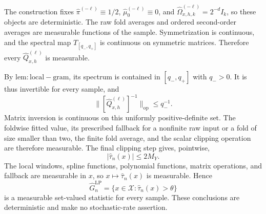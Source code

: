 The construction fixes \(\widehat\pi^{(-\ell)}\equiv1/2\), \(\widehat\mu_0^{(-\ell)}\equiv0\), and \(\widehat\Omega^{(-\ell)}_{x,h,k}=2^{-d}I_k\), so these objects are deterministic. The raw fold averages and ordered second-order averages are measurable functions of the sample. Symmetrization is continuous, and the spectral map \(T_{[q_-,q_+]}\) is continuous on symmetric matrices. Therefore every \(\widehat Q^{(\ell)}_{x,h}\) is measurable.

By \(\mathrm{lem:local-gram}\), its spectrum is contained in \([q_-,q_+]\) with \(q_->0\). It is thus invertible for every sample, and
\[
\|[\widehat Q^{(\ell)}_{x,h}]^{-1}\|_{\mathrm{op}}
\le q_-^{-1}.
\]
Matrix inversion is continuous on this uniformly positive-definite set. The foldwise fitted value, its prescribed fallback for a nonfinite raw input or a fold of size smaller than two, the finite fold average, and the scalar clipping operation are therefore measurable. The final clipping step gives, pointwise,
\[
|\widehat\tau_n(x)|\le2M_Y.
\]
The local windows, spline functions, polynomial functions, matrix operations, and fallback are measurable in \(x\), so \(x\mapsto\widehat\tau_n(x)\) is measurable. Hence
\[
\widehat G_n^{\mathrm{LP}}=\{x\in\mathcal X:\widehat\tau_n(x)>\theta\}
\]
is a measurable set-valued statistic for every sample. These conclusions are deterministic and make no stochastic-rate assertion.